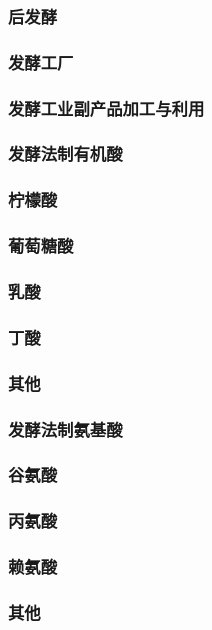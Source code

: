 \documentclass[UTF8]{../../ApplicationUniverse}
\begin{document}
            \subsubsection{后发酵}
        \subsubsection{发酵工厂}
        \subsubsection{发酵工业副产品加工与利用}
    \subsubsection{发酵法制有机酸}
        \subsubsection{柠檬酸}
        \subsubsection{葡萄糖酸}
        \subsubsection{乳酸}
        \subsubsection{丁酸}
        \subsubsection{其他}
    \subsubsection{发酵法制氨基酸}
        \subsubsection{谷氨酸}
        \subsubsection{丙氨酸}
        \subsubsection{赖氨酸}
        \subsubsection{其他}
\end{document}
